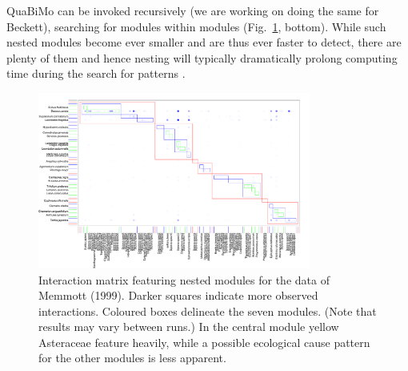 \documentclass[a4paper, 11pt]{article}
\begin{document}
QuaBiMo can be invoked recursively (we are working on doing the same for Beckett), searching for modules within modules (Fig.~\ref{fig:memmottmodules}, bottom). While such nested modules become ever smaller and are thus ever faster to detect, there are plenty of them and hence nesting will typically dramatically prolong computing time during the search for patterns \citep{Memmott1999}.
\begin{figure}
	\includegraphics[width=0.8\textwidth]{figures/memmott1999_nested_modules}
	\caption{Interaction matrix featuring nested modules for the data of Memmott (1999). %
	Darker squares indicate more observed interactions. Coloured boxes delineate the seven modules. (Note that results may vary between runs.) In the central module yellow Asteraceae feature heavily, while a possible ecological cause pattern for the other modules is less apparent. %
	}
\label{fig:memmottmodules}
\end{figure}
\end{document}
